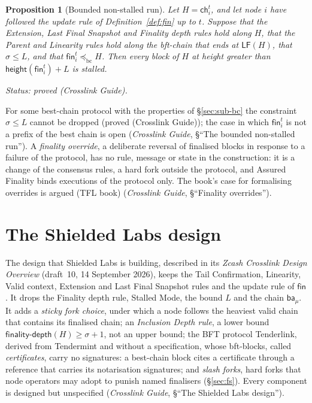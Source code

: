 \documentclass[11pt,a4paper]{article}
\newtheorem{proposition}[theorem]{Proposition}
\theoremstyle{definition}
\newcommand{\bc}{\mathrm{bc}}
\newcommand{\preceqbc}{\preceq_{\bc}}
\newcommand{\ch}{\mathsf{ch}}
\newcommand{\LF}{\mathsf{LF}}
\newcommand{\finalitydepth}{\mathsf{finality\text{-}depth}}
\newcommand{\fin}{\mathsf{fin}}
\newcommand{\ba}{\mathsf{ba}}
\begin{document}
\begin{proposition}[Bounded non-stalled run]\label{prop:bounded-run}
Let $H = \ch_i^t$, and let node $i$ have followed the update rule of
Definition~\ref{def:fin} up to $t$. Suppose that the Extension, Last Final
Snapshot and Finality depth rules hold along $H$, that the Parent and
Linearity rules hold along the bft-chain that ends at $\LF(H)$, that $\sigma
\le L$, and that $\fin_i^t \preceqbc H$. Then every block of $H$ at height
greater than $\mathsf{height}(\fin_i^t) + L$ is stalled.

Status: proved (Crosslink Guide).
\end{proposition}

For some best-chain protocol with the properties of \S\ref{sec:sub-bc} the
constraint $\sigma \le L$ cannot be dropped (proved (Crosslink Guide)); the
case in which $\fin_i^t$ is not a prefix of the best chain is open
(\emph{Crosslink Guide}, \S``The bounded non-stalled run''). A \emph{finality
override}, a deliberate reversal of finalised blocks in response to a failure
of the protocol, has no rule, message or state in the construction: it is a
change of the consensus rules, a hard fork outside the protocol, and Assured
Finality binds executions of the protocol only. The book's case for
formalising overrides is argued (TFL book) (\emph{Crosslink Guide},
\S``Finality overrides'').

\section{The Shielded Labs design}\label{sec:sl}

The design that Shielded Labs is building, described in its \emph{Zcash
Crosslink Design Overview} (draft~10, 14 September 2026), keeps the Tail
Confirmation, Linearity, Valid context, Extension and Last Final Snapshot
rules and the update rule of $\fin$. It drops the Finality depth rule,
Stalled Mode, the bound $L$ and the chain $\ba_\mu$. It adds a \emph{sticky
fork choice}, under which a node follows the heaviest valid chain that
contains its finalised chain; an \emph{Inclusion Depth rule}, a lower bound
$\finalitydepth(H) \ge \sigma + 1$, not an upper bound; the BFT protocol
Tenderlink, derived from Tendermint and without a specification, whose
bft-blocks, called \emph{certificates}, carry no signatures: a best-chain
block cites a certificate through a reference that carries its notarisation
signatures; and \emph{slash forks}, hard forks that node operators may adopt
to punish named finalisers (\S\ref{sec:fs}). Every component is designed
but unspecified (\emph{Crosslink Guide}, \S``The Shielded Labs design'').
\end{document}
